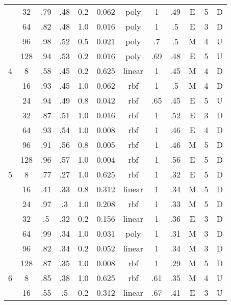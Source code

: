 \begin{table}
\begin{tabular}{|c|c|ccccc||ccccc|}
  &  32 &   .79 &  .48 & 0.2 &    0.062 &    poly &     1 &  .49 &      E & 5 &       D \\
  &  64 &   .82 &  .48 & 1.0 &    0.016 &    poly &     1 &   .5 &      E & 3 &       D \\
  &  96 &   .98 &  .52 & 0.5 &    0.021 &    poly &    .7 &   .5 &      M & 4 &       U \\
  & 128 &   .94 &  .53 & 0.2 &    0.016 &    poly &   .69 &  .48 &      E & 5 &       U \\\hline
4 &   8 &   .58 &  .45 & 0.2 &    0.625 &  linear &     1 &  .45 &      M & 4 &       D \\
  &  16 &   .93 &  .45 & 1.0 &    0.062 &     rbf &     1 &   .5 &      M & 4 &       D \\
  &  24 &   .94 &  .49 & 0.8 &    0.042 &     rbf &   .65 &  .45 &      E & 5 &       U \\
  &  32 &   .87 &  .51 & 1.0 &    0.016 &     rbf &     1 &  .52 &      E & 3 &       D \\
  &  64 &   .93 &  .54 & 1.0 &    0.008 &     rbf &     1 &  .46 &      E & 4 &       D \\
  &  96 &   .91 &  .56 & 0.8 &    0.005 &     rbf &     1 &  .46 &      M & 5 &       D \\
  & 128 &   .96 &  .57 & 1.0 &    0.004 &     rbf &     1 &  .56 &      E & 5 &       D \\\hline
5 &   8 &   .77 &  .27 & 1.0 &    0.625 &     rbf &     1 &  .32 &      E & 5 &       D \\
  &  16 &   .41 &  .33 & 0.8 &    0.312 &  linear &     1 &  .34 &      M & 5 &       D \\
  &  24 &   .97 &   .3 & 1.0 &    0.208 &     rbf &     1 &  .33 &      M & 5 &       D \\
  &  32 &    .5 &  .32 & 0.2 &    0.156 &  linear &     1 &  .36 &      E & 3 &       D \\
  &  64 &   .99 &  .34 & 1.0 &    0.031 &    poly &     1 &  .31 &      M & 3 &       D \\
  &  96 &   .82 &  .34 & 0.2 &    0.052 &  linear &     1 &  .34 &      M & 3 &       D \\
  & 128 &   .87 &  .35 & 1.0 &    0.008 &     rbf &     1 &  .29 &      M & 5 &       D \\\hline
6 &   8 &   .85 &  .38 & 1.0 &    0.625 &     rbf &   .61 &  .35 &      M & 4 &       U \\
  &  16 &   .55 &   .5 & 0.2 &    0.312 &  linear &   .67 &  .41 &      E & 3 &       U \\

\end{tabular}
\end{table}
